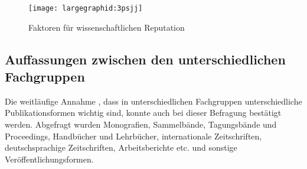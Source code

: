 \begin{figure}[h!]
\texttt{[image: largegraphid:3psjj]}
\caption{Faktoren für wissenschaftlichen Reputation}
\end{figure}

\subsection{Auffassungen zwischen den unterschiedlichen Fachgruppen}

Die weitläufige Annahme \cite{naeder_2010_open}, dass in unterschiedlichen Fachgruppen unterschiedliche Publikationsformen wichtig sind, konnte auch bei dieser Befragung bestätigt werden. Abgefragt wurden Monografien, Sammelbände, Tagungsbände und Proceedings, Handbücher und Lehrbücher, internationale Zeitschriften, deutschsprachige Zeitschriften, Arbeitsberichte etc. und sonstige Veröffentlichungsformen.

